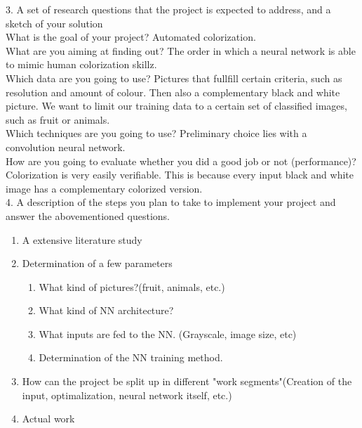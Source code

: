 3. A set of research questions that the project is expected to address, and a sketch of your solution\\
What is the goal of your project? Automated colorization.\\
What are you aiming at finding out? The order in which a neural network is able to mimic human colorization skillz. \\
Which data are you going to use? Pictures that fullfill certain criteria, such as resolution and amount of colour. Then also a complementary black and white picture.
We want to limit our training data to a certain set of classified images, such as fruit or animals.\\
Which techniques are you going to use? Preliminary choice lies with a convolution neural network.\\
How are you going to evaluate whether you did a good job or not (performance)? Colorization is very easily verifiable. This is because every input black and white image has a complementary colorized version.\\
4. A description of the steps you plan to take to implement your project and answer the abovementioned questions. \\
\begin{enumerate}
\item	A extensive literature study
\item	Determination of a few parameters
	\begin{enumerate}
		\item What kind of pictures?(fruit, animals, etc.)
		\item What kind of NN architecture? 
		\item What inputs are fed to the NN. (Grayscale, image size, etc)
		\item Determination of the NN training method. 
	\end{enumerate}

\item How can the project be split up in different "work segments"(Creation of the input, optimalization, neural network itself, etc.)
\item Actual work

\end{enumerate}		
